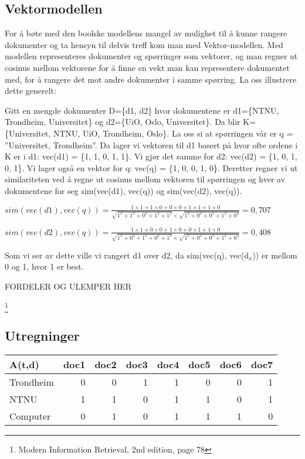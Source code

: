 \documentclass[]{article}
\begin{document}
\pagebreak

\subsection{Vektormodellen}
For å bøte med den boolske modellens mangel av mulighet til å kunne rangere dokumenter og ta hensyn til delvis treff kom man med Vektor-modellen.  Med modellen representeres dokumenter og spørringer som vektorer, og man regner ut cosinus mellom vektorene for å finne en vekt man kan representere dokumentet med, for å rangere det mot andre dokumenter i samme spørring.  La oss illustrere dette generelt:

\vspace{5mm}

Gitt en mengde dokumenter D=\{d1, d2\} hvor dokumentene er d1=\{NTNU, Trondheim, Universitet\} og d2=\{UiO, Oslo, Universitet\}. Da blir K=\{Universitet, NTNU, UiO, Trondheim, Oslo\}. La oss  si at spørringen vår er q = ”Universitet, Trondheim”.  Da lager vi vektoren til d1 basert på hvor ofte ordene i K er i d1: vec(d1) = \{1, 1, 0, 1, 1\}. Vi gjør det samme for d2: vec(d2) = \{1, 0, 1, 0, 1\}. Vi lager også en vektor for q: vec(q) = \{1, 0, 0, 1, 0\}. Deretter regner vi ut similariteten ved å regne ut cosinus mellom vektoren til spørringen og hver av dokumentene for seg sim(vec(d1), vec(q)) og sim(vec(d2), vec(q)). 

\vspace{5mm}

$sim(vec(d1), vec(q)) = \frac{1\times1+1\times0+0\times0+1\times1+1\times0}{\sqrt{1^2+1^2+0^2+1^2+1^2}\times\sqrt{1^2+0^2+0^2+1^2+0^2}} = 0,707$
\vspace{2mm}

$sim(vec(d2), vec(q)) = \frac{1\times1+0\times0+1\times0+0\times1+1\times0}{\sqrt{1^2+0^2+1^2+0^2+1^2}\times\sqrt{1^2+0^2+0^2+1^2+0^2}} = 0,408$
\vspace{5mm}

Som vi ser av dette ville vi rangert d1 over d2, da sim(vec(q), vec(d$_{x}$)) er mellom 0 og 1, hvor 1 er best. 

FORDELER OG ULEMPER HER

\let\thefootnote\relax\footnote{Modern Information Retrieval, 2nd edition, page 78}
\pagebreak

\subsection{Utregninger}

\begin{center}
    \begin{tabular}{|l|r|r|r|r|r|r|r|}
        \hline
        A(t,d)&doc1&doc2&doc3&doc4&doc5&doc6&doc7\\
        \hline
        Trondheim&0&0&1&1&0&0&1\\
        \hline
        NTNU&1&1&0&1&1&0&1\\
        \hline
        Computer&0&1&0&1&1&1&0\\
        \hline
    \end{tabular}
\end{center}
\end{document}

